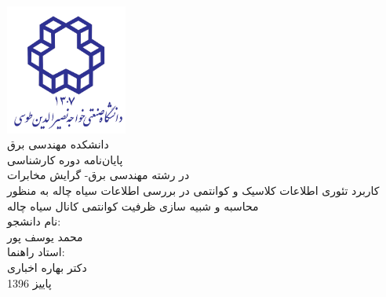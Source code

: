 \pagestyle{empty}
\begin{center}
\includegraphics[width=0.3\textwidth]{logo.png}\\
\Nastaliq
\large{دانشکده مهندسی برق}\\\vspace{1cm}
\titlefont
\large{پایان‌نامه دوره کارشناسی}\\
\large{در رشته مهندسی برق- گرایش مخابرات}\\
\vspace{1cm}
\Large{کاربرد تئوری اطلاعات کلاسیک و کوانتمی در بررسی اطلاعات سیاه چاله به منظور محاسبه و شبیه سازی ظرفیت کوانتمی کانال سیاه چاله}\\\vspace{2cm}
\normalsize{نام دانشجو:}\\
\large{محمد یوسف پور}\\\vspace{2cm}
\normalsize{استاد راهنما:}\\
\large{دکتر بهاره اخباری}\\\vspace{2cm}
\normalsize{پاییز 1396}

\end{center}
\newpage\null\newpage
